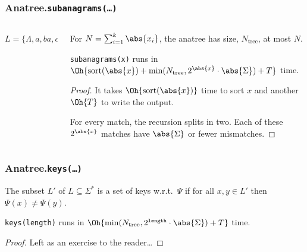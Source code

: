 \documentclass[english, aspectratio=169]{beamer}
\newcommand{\sort}[1]{\text{sort}(#1)}
\begin{document}
\begin{frame}
  \frametitle{Anatree.\texttt{subanagrams(\dots)}}

  \begin{columns}
    \begin{column}{0.55\textwidth}
      \centering

      \begin{tikzpicture}
        
      \end{tikzpicture}

      $L = \{ \Lambda, a, ba, ca, aba, baa \}$
    \end{column}
    \begin{column}{0.45\textwidth}
      \small

      \begin{lemma}
        For $N = \sum_{i = 1}^k \abs{x_i}$, the anatree has size, $N_{\text{tree}}$, at most $N$.
      \end{lemma}

      \pause

      \begin{theorem}
        \texttt{subanagrams(x)} runs in\\
        $\Oh{\sort{\abs{x}} + \min(N_{\text{tree}}, 2^{\abs{x}} \cdot \abs{\Sigma}) + T}$ time.
      \end{theorem}
      \begin{proof}
        It takes $\Oh{\sort{\abs{x}}}$ time to sort $x$ and another $\Oh{T}$ to write the output.

        For every match, the recursion splits in two. Each of these
        $2^{\abs{x}}$ matches have $\abs{\Sigma}$ or fewer mismatches.
      \end{proof}
    \end{column}
  \end{columns}
\end{frame}

\begin{frame}
  \frametitle{Anatree.\texttt{keys(\dots)}}

  \begin{definition}
    The subset $L'$ of $L \subseteq \Sigma^*$ is a set of keys w.r.t.\ $\Psi$ if for all
    $x, y \in L'$ then $\Psi(x) \neq \Psi(y)$.
  \end{definition}

  \vspace{30pt}
  \pause

  \centering
  \begin{minipage}{.74\textwidth\relax}
    \large

    \begin{theorem}
      \texttt{keys(length)} runs in $\Oh{\min(N_{\text{tree}}, 2^{\texttt{length}} \cdot \abs{\Sigma}) + T}$ time.
    \end{theorem}
    \begin{proof}
      Left as an exercise to the reader\dots
    \end{proof}

  \end{minipage}
\end{frame}
\end{document}
